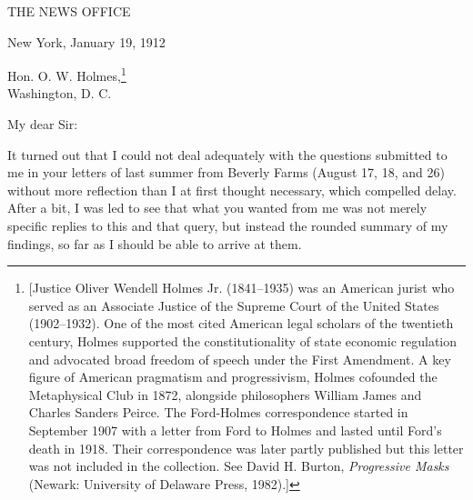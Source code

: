\documentclass[openany,nobib]{tufte-book}
\begin{document}
\vspace{.2in}

\begin{LARGE}


\end{LARGE}

\vspace{0.5in}


\begin{center}

{\Large THE NEWS OFFICE}

\end{center}

\vspace{0.1in}

\hfill New York, January 19, 1912

\vspace{0.2in}

\noindent Hon. O. W. Holmes,\footnote{{[}Justice Oliver Wendell Holmes Jr.
  (1841--1935) was an American jurist who served as an Associate Justice
  of the Supreme Court of the United States (1902--1932). One of the
  most cited American legal scholars of the twentieth century, Holmes
  supported the constitutionality of state economic
  regulation and advocated broad freedom of
  speech under the First Amendment. A key figure of American pragmatism
  and progressivism, Holmes cofounded the Metaphysical Club in 1872,
  alongside philosophers William James and Charles Sanders Peirce. The
  Ford-Holmes correspondence started in September 1907 with a letter from Ford
  to Holmes and lasted until Ford's death in 1918. Their correspondence
  was later partly published but this letter was not included in the
  collection. See David H. Burton, \emph{Progressive Masks} (Newark:
  University of Delaware Press, 1982).{]}}~~\\
Washington, D. C.~~

\vspace{0.1in}

\noindent My dear Sir:~

\vspace{0.05in}

It turned out that I could not deal adequately with the questions
submitted to me in your letters of last summer from Beverly Farms
(August 17, 18, and 26) without more reflection than I at first thought
necessary, which compelled delay. After a bit, I was led to see that
what you wanted from me was not merely specific replies to this and that
query, but instead the rounded summary of my findings, so far as I
should be able to arrive at them.~
\end{document}

